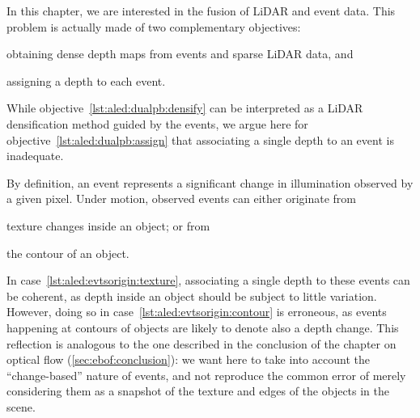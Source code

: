 In this chapter, we are interested in the fusion of LiDAR and event data. This problem is actually made of two complementary objectives:
\begin{enumerate*}[label=\textbf{(\arabic*)}]
  \item obtaining dense depth maps from events and sparse LiDAR data, and\label{lst:aled:dualpb:densify}
  \item assigning a depth to each event.\label{lst:aled:dualpb:assign}
\end{enumerate*}
While objective~\ref{lst:aled:dualpb:densify} can be interpreted as a LiDAR densification method guided by the events, we argue here for objective~\ref{lst:aled:dualpb:assign} that associating a single depth to an event is inadequate.

By definition, an event represents a significant change in illumination observed by a given pixel. Under motion, observed events can either originate from
\begin{enumerate*}[label=\textbf{(\alph*)}]
  \item texture changes inside an object; or from\label{lst:aled:evtsorigin:texture}
  \item the contour of an object.\label{lst:aled:evtsorigin:contour}
\end{enumerate*}
In case~\ref{lst:aled:evtsorigin:texture}, associating a single depth to these events can be coherent, as depth inside an object should be subject to little variation. However, doing so in case~\ref{lst:aled:evtsorigin:contour} is erroneous, as events happening at contours of objects are likely to denote also a depth change. This reflection is analogous to the one described in the conclusion of the chapter on optical flow (\cref{sec:ebof:conclusion}): we want here to take into account the ``change-based'' nature of events, and not reproduce the common error of merely considering them as a snapshot of the texture and edges of the objects in the scene.

